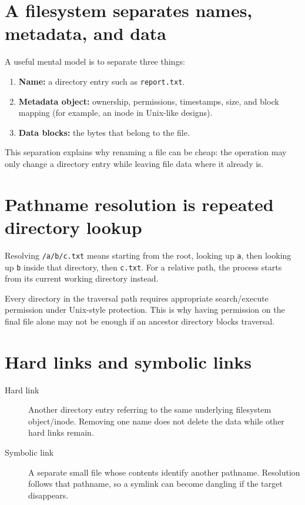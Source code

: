 \section{A filesystem separates names, metadata, and data}
A useful mental model is to separate three things:
\begin{enumerate}
  \item \textbf{Name:} a directory entry such as \texttt{report.txt}.
  \item \textbf{Metadata object:} ownership, permissions, timestamps, size, and block mapping (for example, an inode in Unix-like designs).
  \item \textbf{Data blocks:} the bytes that belong to the file.
\end{enumerate}
This separation explains why renaming a file can be cheap: the operation may only change a directory entry while leaving file data where it already is.

\section{Pathname resolution is repeated directory lookup}
Resolving \texttt{/a/b/c.txt} means starting from the root, looking up \texttt{a}, then looking up \texttt{b} inside that directory, then \texttt{c.txt}. For a relative path, the process starts from its current working directory instead.

Every directory in the traversal path requires appropriate search/execute permission under Unix-style protection. This is why having permission on the final file alone may not be enough if an ancestor directory blocks traversal.

\section{Hard links and symbolic links}
\begin{description}
  \item[Hard link] Another directory entry referring to the same underlying filesystem object/inode. Removing one name does not delete the data while other hard links remain.
  \item[Symbolic link] A separate small file whose contents identify another pathname. Resolution follows that pathname, so a symlink can become dangling if the target disappears.
\end{description}

